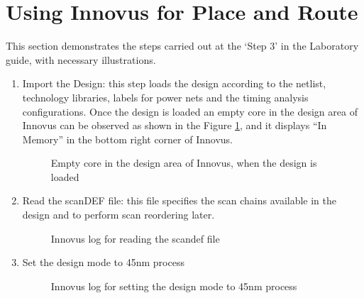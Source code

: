 \documentclass[a4paper,11pt]{article}%
\begin{document}
\pagebreak
\section{Using Innovus for Place and Route}
This section demonstrates the steps carried out at the `Step 3' in the Laboratory guide, with necessary illustrations.

\begin{enumerate}[1.)]
	\item Import the Design: this step loads the design according to the netlist, technology libraries, labels for power nets and the timing analysis configurations. Once the design is loaded an empty core in the design area of Innovus can be observed as shown in the Figure \ref{fig:innovus_1},  and it displays ``In Memory'' in the bottom right corner of Innovus.
	
	\begin{figure}[h]
		\centering
		\caption{Empty core in the design area of Innovus, when the design is loaded}
		\label{fig:innovus_1}
	\end{figure}
	
	
	\item  Read the scanDEF file: this file specifies the scan chains available in the design and to perform scan reordering later.
	
	\begin{figure}[h]
		\centering
		\caption{Innovus log for reading the scan\ac{def} file}
		\label{fig:defIn}
	\end{figure}
	
	\item Set the design mode to 45nm process
	
	\begin{figure}[h]
		\centering
		\caption{Innovus log for setting the design mode to 45nm process}
		\label{fig:setDesignMode}
	\end{figure}
	
\end{enumerate} 

\pagebreak
{\small


}
\end{document}
